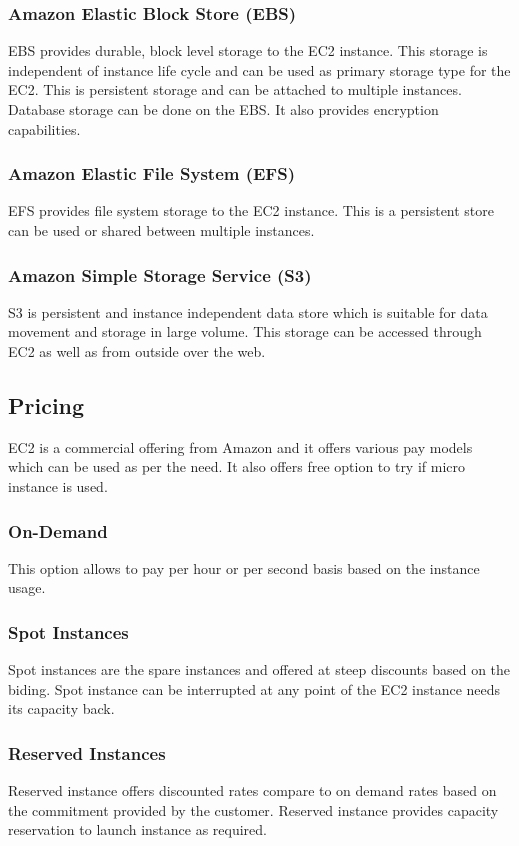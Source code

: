 \subsubsection{Amazon Elastic Block Store (EBS)} \cite{www-aws-ec2Storage}
EBS provides durable, block level storage to the EC2 instance. This storage is independent of instance life cycle and can be used as primary storage type for the EC2. This is persistent storage and can be attached to multiple instances. Database storage can be done on the EBS. It also provides encryption capabilities.
\subsubsection{Amazon Elastic File System (EFS)} \cite{www-aws-ec2Storage}
EFS provides file system storage to the EC2 instance. This is a persistent store can be used or shared between multiple instances.
\subsubsection{Amazon Simple Storage Service (S3)} \cite{www-aws-ec2Storage}
S3 is persistent and instance independent data store which is suitable for data movement and storage in large volume. This storage can be accessed through EC2 as well as from outside over the web. 

\subsection{Pricing}
EC2 is a commercial offering from Amazon and it offers various pay models which can be used as per the need. It also offers free option to try if micro instance is used.
\subsubsection{On-Demand} \cite{www-aws-ec2Pricing}
This option allows to pay per hour or per second basis based on the instance usage.
\subsubsection{Spot Instances} \cite{www-aws-ec2Pricing}
Spot instances are the spare instances and offered at steep discounts based on the biding. Spot instance can be interrupted at any point of the EC2 instance needs its capacity back.
\subsubsection{Reserved Instances} \cite{www-aws-ec2Pricing}
Reserved instance offers discounted rates compare to on demand rates based on the commitment provided by the customer. Reserved instance provides capacity reservation to launch instance as required.
